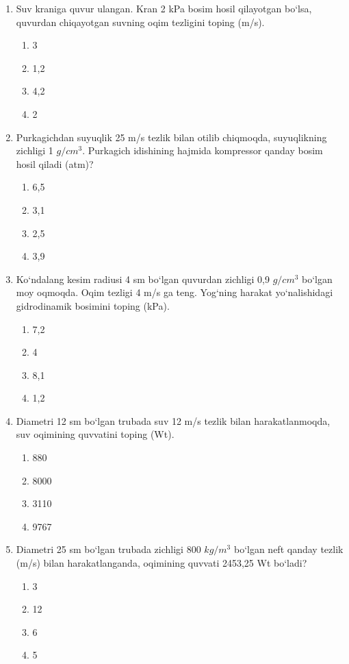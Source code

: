 \begin{enumerate}
\item Suv kraniga quvur ulangan. Kran 2 kPa bosim hosil qilayotgan bo‘lsa, quvurdan chiqayotgan suvning oqim tezligini toping (m/s).
\begin{enumerate}[label=\Alph*)]
\item 3
\item 1,2
\item 4,2
\item 2
\end{enumerate}

\item Purkagichdan suyuqlik 25 m/s tezlik bilan otilib chiqmoqda, suyuqlikning zichligi 1 $g/cm^3$. Purkagich idishining hajmida kompressor qanday bosim hosil qiladi (atm)?
\begin{enumerate}[label=\Alph*)]
\item 6,5
\item 3,1
\item 2,5
\item 3,9
\end{enumerate}

\item Ko‘ndalang kesim radiusi 4 sm bo‘lgan quvurdan zichligi 0,9 $g/cm^3$ bo‘lgan moy oqmoqda. Oqim tezligi 4 m/s ga teng. Yog‘ning harakat yo‘nalishidagi gidrodinamik bosimini toping (kPa).
\begin{enumerate}[label=\Alph*)]
\item 7,2
\item 4
\item 8,1
\item 1,2
\end{enumerate}

\item Diametri 12 sm bo‘lgan trubada suv 12 m/s tezlik bilan harakatlanmoqda, suv oqimining quvvatini toping (Wt).
\begin{enumerate}[label=\Alph*)]
\item 880
\item 8000
\item 3110
\item 9767
\end{enumerate}

\item Diametri 25 sm bo‘lgan trubada zichligi 800 $kg/m^3$ bo‘lgan neft qanday tezlik (m/s) bilan harakatlanganda, oqimining quvvati 2453,25 Wt bo‘ladi?
\begin{enumerate}[label=\Alph*)]
\item 3
\item 12
\item 6
\item 5
\end{enumerate}


\end{enumerate}
